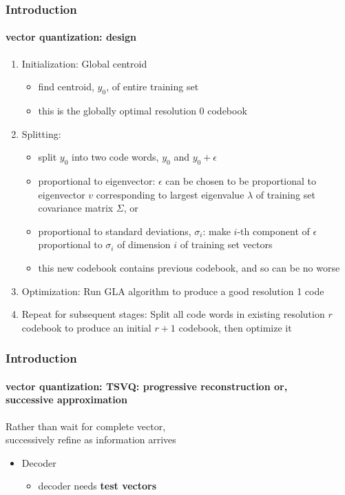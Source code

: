 \begin{frame}
\frametitle{Introduction}
\framesubtitle{vector quantization: design}
\logoCSIPCPL\mypagenum
	\begin{enumerate}
		\item {\color{red}Initialization: Global centroid} 
			\begin{itemize}
				\item find centroid, $y_0$, of entire training set
				\item this is the globally optimal resolution 0 codebook
			\end{itemize}
		\item {\color{red}Splitting}: 
			\begin{itemize}
				\item split $y_0$ into two code words, $y_0$ and $y_0 + \epsilon$
				\item {\color{blue}proportional to eigenvector}: $\epsilon$ can be chosen to be proportional to eigenvector $v$ corresponding to largest eigenvalue $\lambda$ of training set covariance matrix $\Sigma$, or
				\item {\color{blue}proportional to standard deviations, $\sigma_i$}:  make $i$-th component of $\epsilon$ proportional to $\sigma_i$ of dimension $i$ of training set vectors
				\item this new codebook contains previous codebook, and so can be no worse
			\end{itemize}
		\item {\color{red}Optimization}: Run GLA algorithm to produce a good resolution 1 code
		\item {\color{red}Repeat for subsequent stages}: Split all code words in existing resolution $r$ codebook to produce an initial $r+1$ codebook, then optimize it
	\end{enumerate}
\end{frame}


\begin{frame}
\frametitle{Introduction}
\framesubtitle{vector quantization: TSVQ: progressive reconstruction or,\\ successive approximation}
\logoCSIPCPL\mypagenum
	Rather than wait for complete vector,\\
	successively refine as information arrives
	\begin{itemize}
		\item {\color{red}Decoder}
			\begin{itemize}
				\item decoder needs \textbf{test vectors}
			\end{itemize}
	\end{itemize}
\end{frame}




